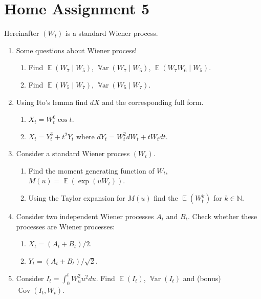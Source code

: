 \documentclass[12pt]{article}
\DeclareMathOperator{\Cov}{\mathbb{C}ov}
\DeclareMathOperator{\Var}{\mathbb{V}ar}
\DeclareMathOperator{\E}{\mathbb{E}}
\begin{document}
\newpage

\section*{Home Assignment 5}

Hereinafter $(W_t)$ is a standard Wiener process.  

\begin{enumerate}

  
  \item Some questions about Wiener process!
  \begin{enumerate}
    \item Find $\E(W_7 \mid W_5)$, $\Var(W_7\mid W_5)$, $\E(W_7 W_6 \mid W_5)$.
    \item Find $\E(W_5 \mid W_7)$, $\Var(W_5\mid W_7)$.
  \end{enumerate}
  
  \item Using Ito's lemma find $dX$ and the corresponding full form.
  \begin{enumerate}
    \item $X_t = W_t^6 \cos t$.
    \item $X_t = Y_t^3 + t^2 Y_t$ where $dY_t = W_t^2 dW_t + tW_t dt$.
  \end{enumerate}

  \item Consider a standard Wiener process $(W_t)$.
  \begin{enumerate}
    \item Find the moment generating function of $W_t$, $M(u) = \E(\exp(u W_t))$.
    \item Using the Taylor expansion for $M(u)$ find the $\E(W_t^k)$ for $k\in \mathbb N$.
  \end{enumerate}

  \item Consider two independent Wiener processes $A_t$ and $B_t$.
  Check whether these processes are Wiener processes:
  \begin{enumerate}
    \item $X_t = (A_t + B_t) / 2$.
    \item $Y_t = (A_t + B_t) / \sqrt{2}$.
  \end{enumerate}

  \item Consider $I_t = \int_0^t W_u^2 u^2 du$. 
  Find $\E(I_t)$, $\Var(I_t)$ and (bonus) $\Cov(I_t, W_t)$.


\end{enumerate}
\end{document}
